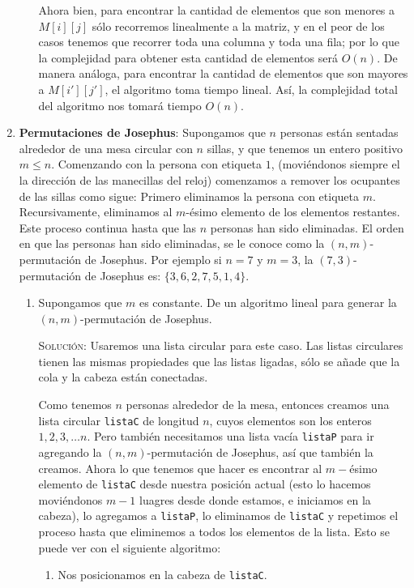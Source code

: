 \documentclass[letterpaper,11pt]{article}
\begin{document}
\begin{enumerate}
\begin{enumerate}
        Ahora bien, para encontrar la cantidad de elementos que son menores a 
        $M[i][j]$ sólo recorremos linealmente a la matriz, y en el peor de los
        casos tenemos que recorrer toda una columna y toda una fila; por lo que 
        la complejidad para obtener esta cantidad de elementos será $O(n)$. De 
        manera análoga, para encontrar la cantidad de elementos que son mayores 
        a $M[i'][j']$, el algoritmo toma tiempo lineal. Así, la complejidad 
        total del algoritmo nos tomará tiempo $O(n)$.
    \end{enumerate}
    
    \item {\bf Permutaciones de Josephus}: Supongamos que $n$ personas están 
    sentadas alrededor de una mesa circular con $n$ sillas, y que tenemos un
    entero positivo $m \leq n$. Comenzando con la persona con etiqueta $1$,
    (moviéndonos siempre el la dirección de las manecillas del reloj) comenzamos
    a remover los ocupantes de las sillas como sigue: Primero eliminamos la 
    persona con etiqueta $m$. Recursivamente, eliminamos al $m$-ésimo elemento 
    de los elementos restantes. Este proceso continua hasta que las $n$ personas 
    han sido eliminadas. El orden en que las personas han sido eliminadas, se 
    le conoce como la $(n, m)$-permutación de Josephus. Por ejemplo si $n=7$ y 
    $m=3$, la $(7,3)$-permutaci\'on de Josephus es: $\{3,6,2,7,5,1,4\}$.
         
    \begin{enumerate}
        \item Supongamos que $m$ es constante. De un algoritmo lineal para generar
        la $(n,m)$-permutación de Josephus.

        \textsc{Solución:} Usaremos una lista circular para este caso. Las listas 
        circulares tienen las mismas propiedades que las listas ligadas, sólo se 
        añade que la cola y la cabeza están conectadas.

        Como tenemos $n$ personas alrededor de la mesa, entonces creamos una lista 
        circular \texttt{listaC} de longitud $n$, cuyos elementos son los enteros 
        $1, 2, 3, \ldots n$. Pero también necesitamos una lista vacía 
        \texttt{listaP} para ir agregando la $(n, m)$-permutación de Josephus, 
        así que también la creamos. Ahora lo que tenemos que hacer es encontrar 
        al $m-$ésimo elemento de \texttt{listaC} desde nuestra posición actual 
        (esto lo hacemos moviéndonos $m-1$ luagres desde donde estamos, e 
        iniciamos en la cabeza), lo agregamos a \texttt{listaP}, lo eliminamos
        de \texttt{listaC} y repetimos el proceso hasta que eliminemos a todos 
        los elementos de la lista. Esto se puede ver con el siguiente algoritmo:
        \begin{enumerate}
            \item Nos posicionamos en la cabeza de \texttt{listaC}.


\end{enumerate}
\end{enumerate}
\end{enumerate}
\end{document}
